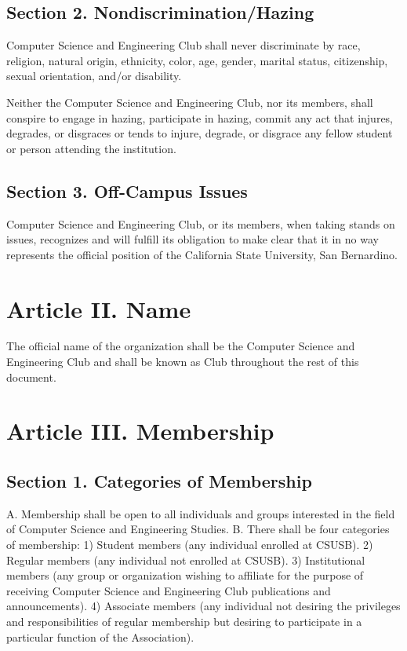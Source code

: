 \documentclass{article}
\begin{document}
  \subsection{Section 2. Nondiscrimination/Hazing}
    Computer Science and Engineering Club shall never discriminate by race, religion, natural origin, ethnicity, color, age, gender, marital status, citizenship, sexual orientation, and/or disability.

    Neither the Computer Science and Engineering Club, nor its members, shall conspire to engage in hazing, participate in hazing, commit any act that injures, degrades, or disgraces or tends to injure, degrade, or disgrace any fellow student or person attending the institution.

  \subsection{Section 3. Off-Campus Issues}
    Computer Science and Engineering Club, or its members, when taking stands on issues, recognizes and will fulfill its obligation to make clear that it in no way represents the official position of the California State University, San Bernardino.

\section{Article II. Name}
  The official name of the organization shall be the Computer Science and Engineering Club and shall be known as Club throughout the rest of this document.

\section{Article III. Membership}
  \subsection{Section 1. Categories of Membership}
  A. Membership shall be open to all individuals and groups interested in the field of Computer Science and Engineering Studies.
B. There shall be four categories of membership:
1)  Student members (any individual enrolled at CSUSB).
2)  Regular members (any individual not enrolled at CSUSB).
3)  Institutional members (any group or organization wishing to affiliate for the purpose of receiving Computer Science and Engineering Club publications and announcements).
4)  Associate members (any individual not desiring the privileges and responsibilities of regular membership but desiring to participate in a particular function of the Association).
\end{document}
